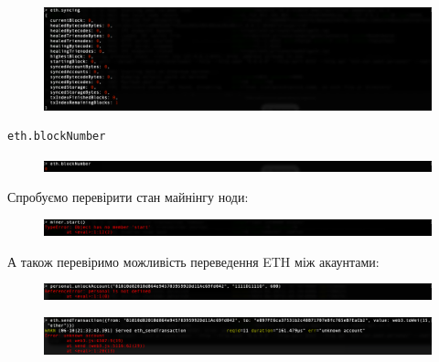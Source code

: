 \begin{figure}[ht]
        \centering
        \includegraphics[scale=0.35]{IMAGES/eth-syncing.png}
        \label{fig_pacman}
\end{figure}
\vspace{-0.75cm}
\begin{verbatim}
eth.blockNumber
\end{verbatim}

\vspace{-0.5cm}

\begin{figure}[h!]
        \centering
        \includegraphics[scale=0.35]{IMAGES/eth-blockNumber.png}
        \label{fig_pacman}
\end{figure}

Спробуємо перевірити стан майнінгу ноди:
\begin{figure}[ht]
        \centering
        \includegraphics[scale=0.35]{IMAGES/minerError.png}
        \label{fig_pacman}
\end{figure}

А також перевіримо можливість переведення ETH між акаунтами:
\begin{figure}[ht]
        \centering
        \includegraphics[scale=0.35]{IMAGES/unlockAccError.png}
        \label{fig_pacman}
\end{figure}
\vspace{-1.25cm}
\begin{figure}[ht]
        \centering
        \includegraphics[scale=0.35]{IMAGES/sendTxError.png}
        \label{fig_pacman}
\end{figure}

